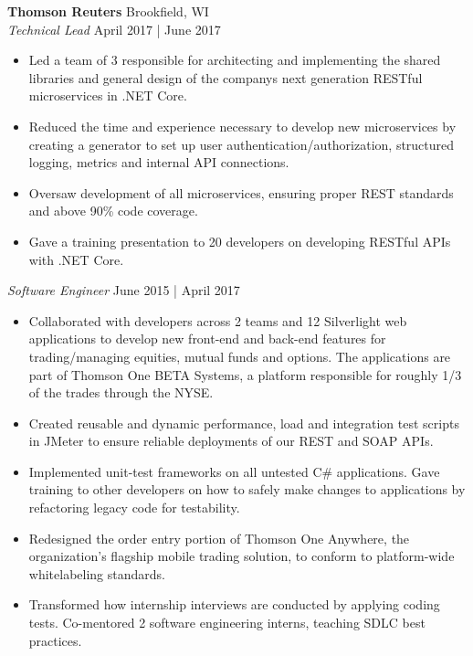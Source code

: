 \documentclass[a4paper]{article}
\begin{document}
\textbf{Thomson Reuters} \hfill Brookfield, WI\\
\textit{Technical Lead} \hfill April 2017 | June 2017\\
\vspace{-1mm}
\begin{itemize} \itemsep 1pt
	\item Led a team of 3 responsible for architecting and implementing the shared libraries and general design of the company\textquotesingle{}s next generation RESTful microservices in .NET Core.
	\item Reduced the time and experience necessary to develop new microservices by creating a generator to set up user authentication/authorization, structured logging, metrics and internal API connections.
	\item Oversaw development of all microservices, ensuring proper REST standards and above 90\% code coverage.
	\item Gave a training presentation to 20 developers on developing RESTful APIs with .NET Core.
\end{itemize}
\vspace{-1mm}
\textit{Software Engineer} \hfill June 2015 | April 2017\\
\vspace{-1mm}
\begin{itemize} \itemsep 1pt
	\item Collaborated with developers across 2 teams and 12 Silverlight web applications to develop new front-end and back-end features for trading/managing equities, mutual funds and options. The applications are part of Thomson One BETA Systems, a platform responsible for roughly 1/3 of the trades through the NYSE.
	\item Created reusable and dynamic performance, load and integration test scripts in JMeter to ensure reliable deployments of our REST and SOAP APIs.
	\item Implemented unit-test frameworks on all untested C\# applications. Gave training to other developers on how to safely make changes to applications by refactoring legacy code   for testability.
	\item Redesigned the order entry portion of Thomson One Anywhere, the organization's flagship mobile trading solution, to conform to platform-wide whitelabeling standards.
	\item Transformed how internship interviews are conducted by applying coding tests. Co-mentored 2 software engineering interns, teaching SDLC best practices.
\end{itemize}
\vspace{-1mm}
\end{document}
